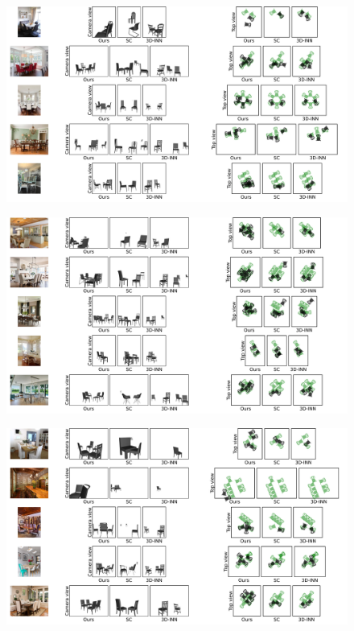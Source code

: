 \begin{figure}
    \includegraphics[width=\textwidth]{figures/qualitative_results/full/qual_results_3.pdf}
\end{figure}
\begin{figure}
    \includegraphics[width=\textwidth]{figures/qualitative_results/full/qual_results_4.pdf}
\end{figure}
\begin{figure}
    \includegraphics[width=\textwidth]{figures/qualitative_results/full/qual_results_5.pdf}
\end{figure}
